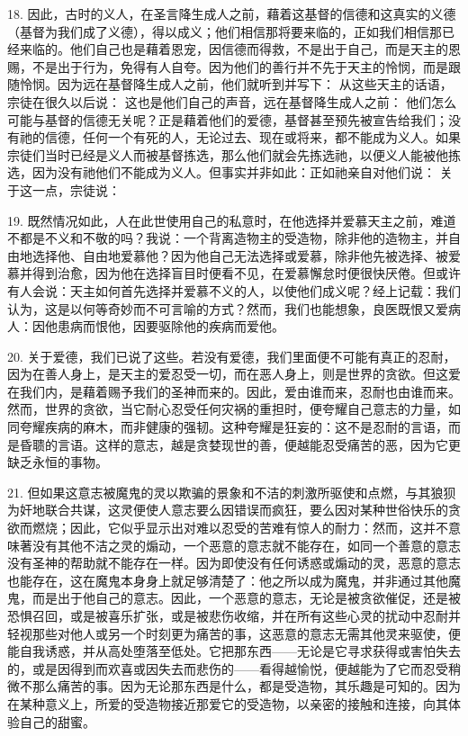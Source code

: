 18. 因此，古时的义人，在圣言降生成人之前，藉着这基督的信德和这真实的义德（基督为我们成了义德），得以成义；他们相信那将要来临的，正如我们相信那已经来临的。他们自己也是藉着恩宠，因信德而得救，不是出于自己，而是天主的恩赐，不是出于行为，免得有人自夸。因为他们的善行并不先于天主的怜悯，而是跟随怜悯。因为远在基督降生成人之前，他们就听到并写下： 从这些天主的话语，宗徒在很久以后说： 这也是他们自己的声音，远在基督降生成人之前： 他们怎么可能与基督的信德无关呢？正是藉着他们的爱德，基督甚至预先被宣告给我们；没有祂的信德，任何一个有死的人，无论过去、现在或将来，都不能成为义人。如果宗徒们当时已经是义人而被基督拣选，那么他们就会先拣选祂，以便义人能被他拣选，因为没有祂他们不能成为义人。但事实并非如此：正如祂亲自对他们说： 关于这一点，宗徒说：\par

19. 既然情况如此，人在此世使用自己的私意时，在他选择并爱慕天主之前，难道不都是不义和不敬的吗？我说：一个背离造物主的受造物，除非他的造物主，并自由地选择他、自由地爱慕他？因为他自己无法选择或爱慕，除非他先被选择、被爱慕并得到治愈，因为他在选择盲目时便看不见，在爱慕懈怠时便很快厌倦。但或许有人会说：天主如何首先选择并爱慕不义的人，以使他们成义呢？经上记载：我们认为，这是以何等奇妙而不可言喻的方式？然而，我们也能想象，良医既恨又爱病人：因他患病而恨他，因要驱除他的疾病而爱他。\par

20. 关于爱德，我们已说了这些。若没有爱德，我们里面便不可能有真正的忍耐，因为在善人身上，是天主的爱忍受一切，而在恶人身上，则是世界的贪欲。但这爱在我们内，是藉着赐予我们的圣神而来的。因此，爱由谁而来，忍耐也由谁而来。然而，世界的贪欲，当它耐心忍受任何灾祸的重担时，便夸耀自己意志的力量，如同夸耀疾病的麻木，而非健康的强韧。这种夸耀是狂妄的：这不是忍耐的言语，而是昏聩的言语。这样的意志，越是贪婪现世的善，便越能忍受痛苦的恶，因为它更缺乏永恒的事物。\par

21. 但如果这意志被魔鬼的灵以欺骗的景象和不洁的刺激所驱使和点燃，与其狼狈为奸地联合共谋，这灵便使人意志要么因错误而疯狂，要么因对某种世俗快乐的贪欲而燃烧；因此，它似乎显示出对难以忍受的苦难有惊人的耐力：然而，这并不意味著没有其他不洁之灵的煽动，一个恶意的意志就不能存在，如同一个善意的意志没有圣神的帮助就不能存在一样。因为即使没有任何诱惑或煽动的灵，恶意的意志也能存在，这在魔鬼本身身上就足够清楚了：他之所以成为魔鬼，并非通过其他魔鬼，而是出于他自己的意志。因此，一个恶意的意志，无论是被贪欲催促，还是被恐惧召回，或是被喜乐扩张，或是被悲伤收缩，并在所有这些心灵的扰动中忍耐并轻视那些对他人或另一个时刻更为痛苦的事，这恶意的意志无需其他灵来驱使，便能自我诱惑，并从高处堕落至低处。它把那东西——无论是它寻求获得或害怕失去的，或是因得到而欢喜或因失去而悲伤的——看得越愉悦，便越能为了它而忍受稍微不那么痛苦的事。因为无论那东西是什么，都是受造物，其乐趣是可知的。因为在某种意义上，所爱的受造物接近那爱它的受造物，以亲密的接触和连接，向其体验自己的甜蜜。\par

